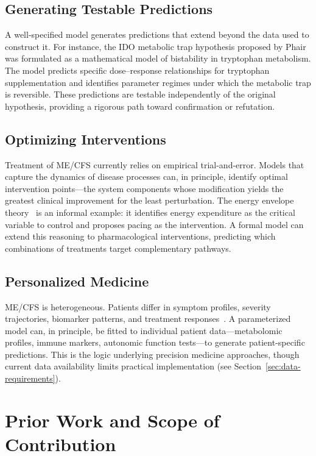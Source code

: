 \subsection{Generating Testable Predictions}

A well-specified model generates predictions that extend beyond the data used to construct it. For instance, the IDO metabolic trap hypothesis proposed by Phair~\cite{phair2019ido} was formulated as a mathematical model of bistability in tryptophan metabolism. The model predicts specific dose--response relationships for tryptophan supplementation and identifies parameter regimes under which the metabolic trap is reversible. These predictions are testable independently of the original hypothesis, providing a rigorous path toward confirmation or refutation.

\subsection{Optimizing Interventions}

Treatment of ME/CFS currently relies on empirical trial-and-error. Models that capture the dynamics of disease processes can, in principle, identify optimal intervention points---the system components whose modification yields the greatest clinical improvement for the least perturbation. The energy envelope theory~\cite{jason2012energy,jason2009energy} is an informal example: it identifies energy expenditure as the critical variable to control and proposes pacing as the intervention. A formal model can extend this reasoning to pharmacological interventions, predicting which combinations of treatments target complementary pathways.

\subsection{Personalized Medicine}

ME/CFS is heterogeneous. Patients differ in symptom profiles, severity trajectories, biomarker patterns, and treatment responses~\cite{Hornig2015,Montoya2017}. A parameterized model can, in principle, be fitted to individual patient data---metabolomic profiles, immune markers, autonomic function tests---to generate patient-specific predictions. This is the logic underlying precision medicine approaches, though current data availability limits practical implementation (see Section~\ref{sec:data-requirements}).

\section{Prior Work and Scope of Contribution}
\label{sec:prior-work}

